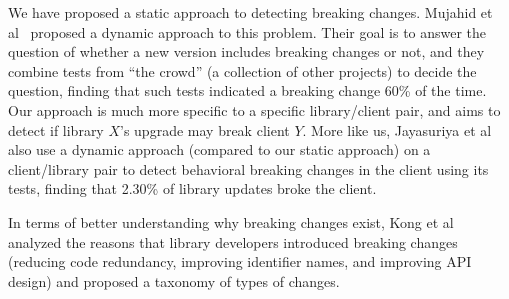 We have proposed a static approach to detecting breaking changes. Mujahid et al~\cite{mujahid20:_using_other_tests_ident_break_updat} proposed a dynamic approach to this problem. Their goal is to answer the question of whether a new version includes breaking changes or not, and they combine tests from ``the crowd'' (a collection of other projects) to decide the question, finding that such tests indicated a breaking change 60\% of the time. Our approach is much more specific to a specific library/client pair, and aims to detect if library $X$'s upgrade may break client $Y$. More like us, Jayasuriya et al~\cite{jayasuriya24:_under_apis} also use a dynamic approach (compared to our static approach) on a client/library pair to detect behavioral breaking changes in the client using its tests, finding that 2.30\% of library updates broke the client.

In terms of better understanding why breaking changes exist, Kong et al~\cite{kong25:_towar_better_compr_break_chang_npm_ecosy} analyzed the reasons that library developers introduced breaking changes (reducing code redundancy, improving identifier names, and improving API design) and proposed a taxonomy of types of changes.
